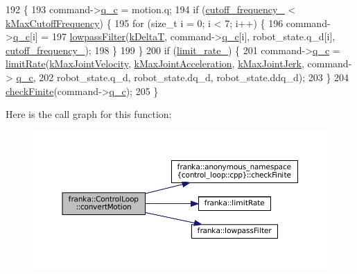 \begin{DoxyCode}
192                                                             \{
193   command->\hyperlink{structresearch__interface_1_1robot_1_1MotionGeneratorCommand_aae29370603fa15690aeab4961aec0f36}{q\_c} = motion.q;
194   \textcolor{keywordflow}{if} (\hyperlink{classfranka_1_1ControlLoop_a1c01098536341d3e1da2617a08129529}{cutoff\_frequency\_} < \hyperlink{namespacefranka_adb10b364af8deb9e17d9bcc1ff2695be}{kMaxCutoffFrequency}) \{
195     \textcolor{keywordflow}{for} (\textcolor{keywordtype}{size\_t} i = 0; i < 7; i++) \{
196       command->\hyperlink{structresearch__interface_1_1robot_1_1MotionGeneratorCommand_aae29370603fa15690aeab4961aec0f36}{q\_c}[i] =
197           \hyperlink{namespacefranka_a94c21b0e87afce0147a9cd6025c239ca}{lowpassFilter}(\hyperlink{namespacefranka_a1e207a0d5a6e90c1e1a78e6e1057120a}{kDeltaT}, command->\hyperlink{structresearch__interface_1_1robot_1_1MotionGeneratorCommand_aae29370603fa15690aeab4961aec0f36}{q\_c}[i], robot\_state.q\_d[i], 
      \hyperlink{classfranka_1_1ControlLoop_a1c01098536341d3e1da2617a08129529}{cutoff\_frequency\_});
198     \}
199   \}
200   \textcolor{keywordflow}{if} (\hyperlink{classfranka_1_1ControlLoop_a660f32d739c7f7ed05fa97b06220b98b}{limit\_rate\_}) \{
201     command->\hyperlink{structresearch__interface_1_1robot_1_1MotionGeneratorCommand_aae29370603fa15690aeab4961aec0f36}{q\_c} = \hyperlink{namespacefranka_a77e127a920da5b0ad29877ec3ff29f15}{limitRate}(\hyperlink{namespacefranka_a6d451800a90b939422dc9c3fb103ca23}{kMaxJointVelocity}, 
      \hyperlink{namespacefranka_a826ecf0b7d214df69c1ee416d3e66b93}{kMaxJointAcceleration}, \hyperlink{namespacefranka_a600a21a6151ff2eee38294293dd8aeec}{kMaxJointJerk}, command->
      \hyperlink{structresearch__interface_1_1robot_1_1MotionGeneratorCommand_aae29370603fa15690aeab4961aec0f36}{q\_c},
202                              robot\_state.q\_d, robot\_state.dq\_d, robot\_state.ddq\_d);
203   \}
204   \hyperlink{namespacefranka_1_1anonymous__namespace_02control__loop_8cpp_03_af284e9c97573a00e6fc31f0c716d6add}{checkFinite}(command->\hyperlink{structresearch__interface_1_1robot_1_1MotionGeneratorCommand_aae29370603fa15690aeab4961aec0f36}{q\_c});
205 \}
\end{DoxyCode}
Here is the call graph for this function\+:
\nopagebreak
\begin{figure}[H]
\begin{center}
\leavevmode
\includegraphics[width=350pt]{classfranka_1_1ControlLoop_aab46712ac11588d598ff9d99958ba98d_cgraph}
\end{center}
\end{figure}
